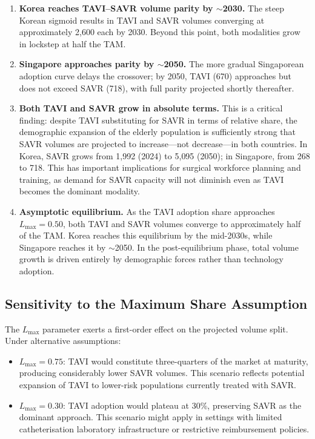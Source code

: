 \documentclass[12pt, a4paper]{article}
\begin{document}
\begin{enumerate}[leftmargin=*, itemsep=4pt]
    \item \textbf{Korea reaches TAVI--SAVR volume parity by $\sim$2030.} The steep Korean sigmoid results in TAVI and SAVR volumes converging at approximately 2{,}600 each by 2030. Beyond this point, both modalities grow in lockstep at half the TAM.

    \item \textbf{Singapore approaches parity by $\sim$2050.} The more gradual Singaporean adoption curve delays the crossover; by 2050, TAVI (670) approaches but does not exceed SAVR (718), with full parity projected shortly thereafter.

    \item \textbf{Both TAVI and SAVR grow in absolute terms.} This is a critical finding: despite TAVI substituting for SAVR in terms of relative share, the demographic expansion of the elderly population is sufficiently strong that SAVR volumes are projected to increase---not decrease---in both countries. In Korea, SAVR grows from 1{,}992 (2024) to 5{,}095 (2050); in Singapore, from 268 to 718. This has important implications for surgical workforce planning and training, as demand for SAVR capacity will not diminish even as TAVI becomes the dominant modality.

    \item \textbf{Asymptotic equilibrium.} As the TAVI adoption share approaches $L_{\max} = 0.50$, both TAVI and SAVR volumes converge to approximately half of the TAM. Korea reaches this equilibrium by the mid-2030s, while Singapore reaches it by $\sim$2050. In the post-equilibrium phase, total volume growth is driven entirely by demographic forces rather than technology adoption.
\end{enumerate}

\subsection{Sensitivity to the Maximum Share Assumption}

The $L_{\max}$ parameter exerts a first-order effect on the projected volume split. Under alternative assumptions:

\begin{itemize}[leftmargin=*, itemsep=4pt]
    \item \textbf{$L_{\max} = 0.75$}: TAVI would constitute three-quarters of the market at maturity, producing considerably lower SAVR volumes. This scenario reflects potential expansion of TAVI to lower-risk populations currently treated with SAVR.
    \item \textbf{$L_{\max} = 0.30$}: TAVI adoption would plateau at 30\%, preserving SAVR as the dominant approach. This scenario might apply in settings with limited catheterisation laboratory infrastructure or restrictive reimbursement policies.
\end{itemize}
\end{document}

